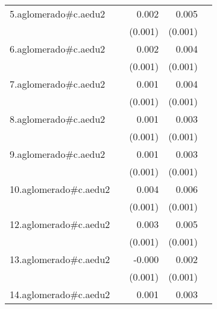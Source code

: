 {\begin{longtable}{l*{4}{D{.}{.}{-1}}}
\addlinespace
5.aglomerado#c.aedu2&                     &       0.002         &       0.005\sym{***}&                     \\
            &                     &     (0.001)         &     (0.001)         &                     \\
\addlinespace
6.aglomerado#c.aedu2&                     &       0.002         &       0.004\sym{***}&                     \\
            &                     &     (0.001)         &     (0.001)         &                     \\
\addlinespace
7.aglomerado#c.aedu2&                     &       0.001         &       0.004\sym{***}&                     \\
            &                     &     (0.001)         &     (0.001)         &                     \\
\addlinespace
8.aglomerado#c.aedu2&                     &       0.001         &       0.003\sym{***}&                     \\
            &                     &     (0.001)         &     (0.001)         &                     \\
\addlinespace
9.aglomerado#c.aedu2&                     &       0.001         &       0.003\sym{**} &                     \\
            &                     &     (0.001)         &     (0.001)         &                     \\
\addlinespace
10.aglomerado#c.aedu2&                     &       0.004\sym{**} &       0.006\sym{***}&                     \\
            &                     &     (0.001)         &     (0.001)         &                     \\
\addlinespace
12.aglomerado#c.aedu2&                     &       0.003\sym{*}  &       0.005\sym{***}&                     \\
            &                     &     (0.001)         &     (0.001)         &                     \\
\addlinespace
13.aglomerado#c.aedu2&                     &      -0.000         &       0.002\sym{**} &                     \\
            &                     &     (0.001)         &     (0.001)         &                     \\
\addlinespace
14.aglomerado#c.aedu2&                     &       0.001         &       0.003\sym{***}&                     \\

\end{longtable}}
